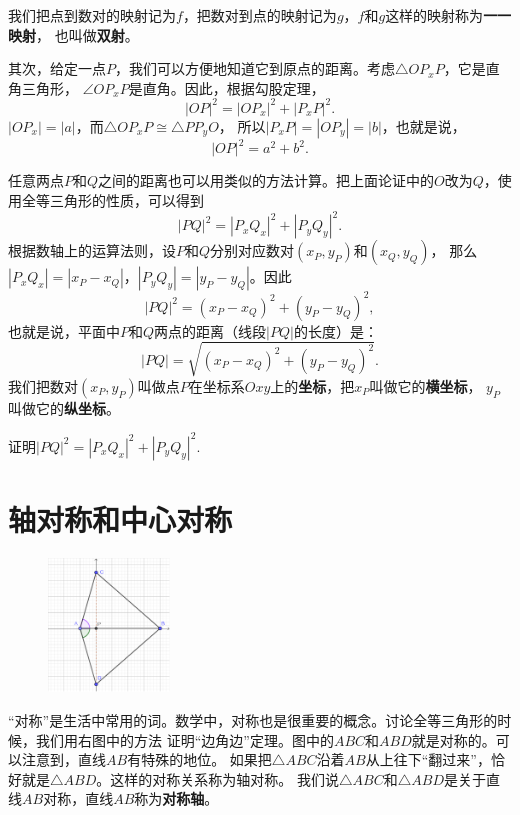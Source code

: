 \documentclass[12pt,UTF8]{ctexbook}
\begin{document}
我们把点到数对的映射记为$f$，把数对到点的映射记为$g$，$f$和$g$这样的映射称为\textbf{一一映射}，
也叫做\textbf{双射}。

其次，给定一点$P$，我们可以方便地知道它到原点的距离。考虑$\triangle OP_xP$，它是直角三角形，
$\angle OP_xP$是直角。因此，根据勾股定理，
$$|OP|^2 = |OP_x|^2 + |P_xP|^2.$$
$|OP_x| = |a|$，而$\triangle OP_xP\cong \triangle PP_yO$，
所以$|P_xP| = |OP_y| = |b|$，也就是说，
$$ |OP|^2 = a^2 + b^2.$$

任意两点$P$和$Q$之间的距离也可以用类似的方法计算。把上面论证中的$O$改为$Q$，使用全等三角形的性质，可以得到
$$|PQ|^2 = |P_xQ_x|^2 + |P_yQ_y|^2.$$
根据数轴上的运算法则，设$P$和$Q$分别对应数对$(x_P, y_P)$和$(x_Q, y_Q)$，
那么$|P_xQ_x| = |x_P- x_Q|$，$|P_yQ_y| = |y_P- y_Q|$。因此
$$ |PQ|^2 = (x_P- x_Q)^2 + (y_P - y_Q)^2,$$
也就是说，平面中$P$和$Q$两点的距离（线段$|PQ|$的长度）是：
$$ |PQ| = \sqrt{(x_P- x_Q)^2 + (y_P - y_Q)^2}.$$
我们把数对$(x_P, y_P)$叫做点$P$在坐标系$Oxy$上的\textbf{坐标}，把$x_P$叫做它的\textbf{横坐标}，
$y_P$叫做它的\textbf{纵坐标}。
\begin{xt}\label{ex:4-0-0}
    证明$|PQ|^2 = |P_xQ_x|^2 + |P_yQ_y|^2.$
\end{xt}

\section{轴对称和中心对称}
\begin{figure} %
    \vspace{-30pt}
    \centering
    \includegraphics[width=0.288\textwidth]{tu/坐标系3.png}
\end{figure}

“对称”是生活中常用的词。数学中，对称也是很重要的概念。讨论全等三角形的时候，我们用右图中的方法
证明“边角边”定理。图中的$ABC$和$ABD$就是对称的。可以注意到，直线$AB$有特殊的地位。
如果把$\triangle ABC$沿着$AB$从上往下“翻过来”，恰好就是$\triangle ABD$。这样的对称关系称为轴对称。
我们说$\triangle ABC$和$\triangle ABD$是关于直线$AB$对称，直线$AB$称为\textbf{对称轴}。
\end{document}
